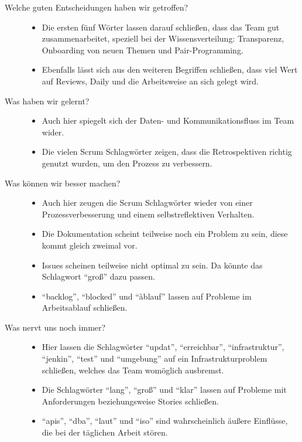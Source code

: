 \begin{description}
    \item[Welche guten Entscheidungen haben wir getroffen?] \hfill
    \begin{itemize}[noitemsep]
      \item Die ersten fünf Wörter lassen darauf schließen, dass das Team gut zusammenarbeitet, speziell bei der Wissensverteilung: Transparenz, Onboarding von neuen Themen und Pair-Programming.
      \item Ebenfalls lässt sich aus den weiteren Begriffen schließen, dass viel Wert auf Reviews, Daily und die Arbeitsweise an sich gelegt wird.
    \end{itemize}
    \item[Was haben wir gelernt?] \hfill
    \begin{itemize}[noitemsep]
      \item Auch hier spiegelt sich der Daten- und Kommunikationsfluss im Team wider.
      \item Die vielen Scrum Schlagwörter zeigen, dass die Retrospektiven richtig genutzt wurden, um den Prozess zu verbessern.
    \end{itemize}
    \item[Was können wir besser machen?] \hfill
    \begin{itemize}[noitemsep]
      \item Auch hier zeugen die Scrum Schlagwörter wieder von einer Prozessverbesserung und einem selbstreflektiven Verhalten.
      \item Die Dokumentation scheint teilweise noch ein Problem zu sein, diese kommt gleich zweimal vor.
      \item Issues scheinen teilweise nicht optimal zu sein. Da könnte das Schlagwort ``groß'' dazu passen.
      \item ``backlog'', ``blocked'' und ``àblauf'' lassen auf Probleme im Arbeitsablauf schließen.
    \end{itemize}
    \item[Was nervt uns noch immer?] \hfill
    \begin{itemize}[noitemsep]
      \item Hier lassen die Schlagwörter ``updat'', ``erreichbar'', ``infrastruktur'', ``jenkin'', ``test'' und ``umgebung'' auf ein Infrastrukturproblem schließen, welches das Team womöglich ausbremst.
      \item Die Schlagwörter ``lang'', ``groß'' und ``klar'' lassen auf Probleme mit Anforderungen beziehungsweise Stories schließen.
      \item ``apis'', ``dba'', ``laut'' und ``iso'' sind wahrscheinlich äußere Einflüsse, die bei der täglichen Arbeit stören.
    \end{itemize}
  \end{description}

